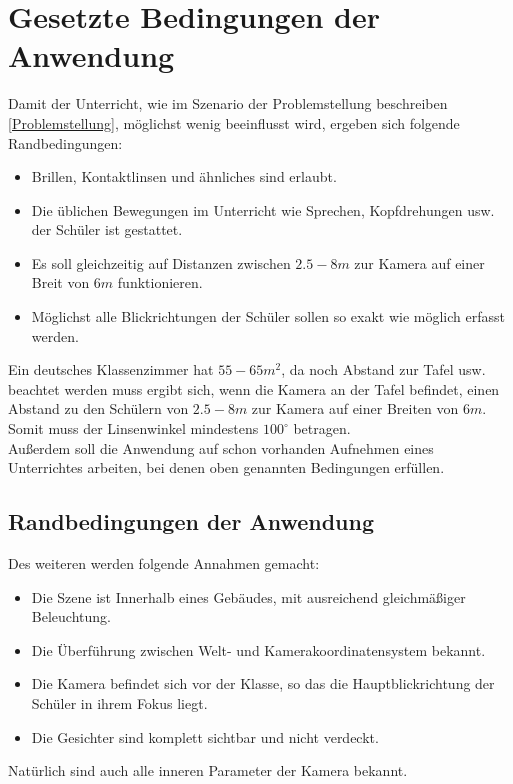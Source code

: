 \section{Gesetzte Bedingungen der Anwendung}
Damit der Unterricht, wie im Szenario der Problemstellung beschreiben \ref{Problemstellung}, möglichst wenig beeinflusst wird, ergeben sich folgende Randbedingungen:
\begin{itemize}
\item Brillen, Kontaktlinsen und ähnliches sind erlaubt.
\item Die üblichen Bewegungen im Unterricht wie Sprechen, Kopfdrehungen usw. der Schüler ist gestattet.
\item Es soll gleichzeitig auf Distanzen zwischen $2.5 - 8m$ zur Kamera auf einer Breit von $6m$ funktionieren.
\item Möglichst alle Blickrichtungen der Schüler sollen so exakt wie möglich erfasst werden.
\end{itemize}
Ein deutsches Klassenzimmer hat $55-65m^2$, da noch Abstand zur Tafel usw. beachtet werden muss ergibt sich, wenn die Kamera an der Tafel befindet, einen Abstand zu den Schülern von $2.5 - 8m$ zur Kamera auf einer Breiten von $6m$. Somit muss der Linsenwinkel mindestens $100^\circ$ betragen.\\
Außerdem soll die Anwendung auf schon vorhanden Aufnehmen eines Unterrichtes arbeiten, bei denen oben genannten Bedingungen erfüllen.
\subsection{Randbedingungen der Anwendung}
Des weiteren werden folgende Annahmen gemacht:
\begin{itemize}
\item Die Szene ist Innerhalb eines Gebäudes, mit ausreichend gleichmäßiger Beleuchtung.
\item Die Überführung zwischen Welt- und Kamerakoordinatensystem bekannt.
\item Die Kamera befindet sich vor der Klasse, so das die Hauptblickrichtung der Schüler in ihrem Fokus liegt.
\item Die Gesichter sind komplett sichtbar und nicht verdeckt.
\end{itemize}
Natürlich sind auch alle inneren Parameter der Kamera bekannt.